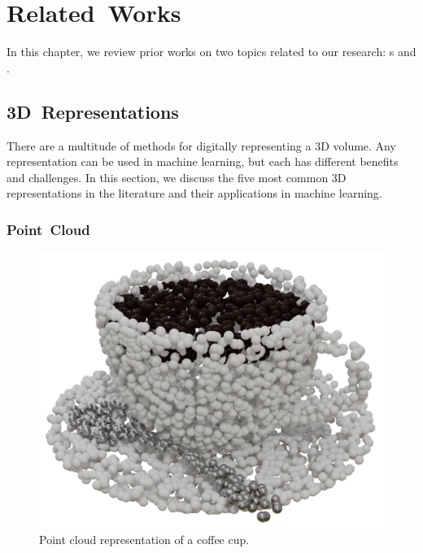 
\chapter{Related~Works}
\label{chap:related_works}

In this chapter, we review prior works on two topics related to our research: s and .

\section{3D~Representations}
\label{sec:3d_representations}

There are a multitude of methods for digitally representing a 3D volume. Any representation can be used in machine learning, but each has different benefits and challenges. In this section, we discuss the five most common 3D representations in the literature and their applications in machine learning.


\subsection{Point~Cloud}
\label{subsec:point_cloud}

\begin{figure}[h]
	\centering
	\includegraphics[scale=0.2]{Images/Point Cloud Cup}
	\caption{Point cloud representation of a coffee cup.}
	\label{fig:point_cloud_cup}
\end{figure}

